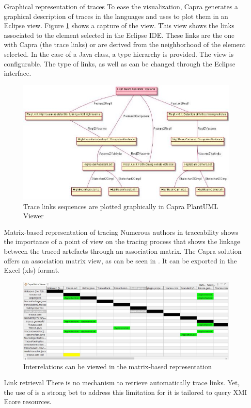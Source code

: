 \begin{descriptioncompact}
    \item[Graphical representation of traces] %
To ease the visualization, Capra generates a graphical description of traces in the  languages and uses  to plot them in an Eclipse view. Figure \ref{fig:plantuml} shows a capture of the view.
This view shows the links associated to the element selected in the Eclipse IDE. These links are the one  with Capra (the trace links) or are derived from the neighborhood of the element selected. In the case of a Java class, a type hierarchy is provided.
The view is configurable. The type of links, as well as  can be changed through the Eclipse interface.  
\begin{figure}[h] 
	\centering
	\includegraphics[width=.60\linewidth]{images/plantuml-viewer.jpg}
	\caption{Trace links sequences are plotted graphically in Capra PlantUML Viewer}
	\label{fig:plantuml}
\end{figure}

    \item[Matrix-based representation of tracing] 
Numerous authors in traceability shows the importance of a  point of view on the tracing process that shows the linkage between the traced artefacts through an association matrix. The Capra solution offers an association matrix view, as can be seen in . It can be exported in the Excel (xls) format.
\begin{figure}[h] 
	\centering
	\includegraphics[width=.65\linewidth]{images/matrixViewer.jpg}
	\caption{Interrelations can be viewed in the matrix-based representation}
	\label{fig:matrixviewer}
\end{figure}

    \item[Link retrieval] There is no mechanism to retrieve automatically trace links. Yet, the use of  is a strong bet to address this limitation for it is tailored to query XMI Ecore resources.
\end{descriptioncompact}


